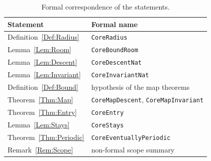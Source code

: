 \documentclass[11pt,letterpaper]{article}
\begin{document}
\begin{table}[htbp]
\centering
\begin{tabular}{ll}
\toprule
Statement & Formal name \\
\midrule
Definition~\ref{Def:Radius} & \texttt{CoreRadius} \\
Lemma~\ref{Lem:Room} & \texttt{CoreBoundRoom} \\
Lemma~\ref{Lem:Descent} & \texttt{CoreDescentNat} \\
Lemma~\ref{Lem:Invariant} & \texttt{CoreInvariantNat} \\
Definition~\ref{Def:Bound} & hypothesis of the map theorems \\
Theorem~\ref{Thm:Map} & \texttt{CoreMapDescent}, \texttt{CoreMapInvariant} \\
Theorem~\ref{Thm:Entry} & \texttt{CoreEntry} \\
Lemma~\ref{Lem:Stays} & \texttt{CoreStays} \\
Theorem~\ref{Thm:Periodic} & \texttt{CoreEventuallyPeriodic} \\
Remark~\ref{Rem:Scope} & non-formal scope summary \\
\bottomrule
\end{tabular}
\caption{Formal correspondence of the statements.}
\label{Table:SignedCoreLean}
\end{table}
\end{document}
